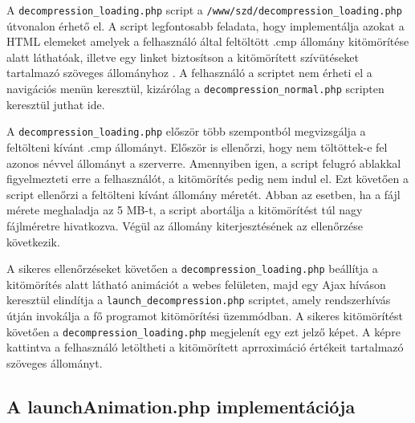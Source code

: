 \documentclass[oneside,titlepage,12pt,a4paper]{report}
\begin{document}
A \texttt{decompression\_loading.php} script a \texttt{/www/szd/decompression\_loading.php} útvonalon érhető el. A script legfontosabb feladata, hogy implementálja azokat a HTML elemeket amelyek a felhasználó által feltöltött .cmp állomány kitömörítése alatt láthatóak, illetve egy linket biztosítson a kitömörített szívütéseket tartalmazó szöveges állományhoz . A felhasználó a scriptet nem érheti el a navigációs menün keresztül, kizárólag a \texttt{decompression\_normal.php} scripten keresztül juthat ide. 
\par A \texttt{decompression\_loading.php} először több szempontból megvizsgálja a feltölteni kívánt .cmp állományt. Először is ellenőrzi, hogy nem töltöttek-e fel azonos névvel állományt a szerverre. Amennyiben igen, a script felugró ablakkal figyelmezteti erre a felhasználót, a kitömörítés pedig nem indul el. Ezt követően a script ellenőrzi a feltölteni kívánt állomány méretét. Abban az esetben, ha a fájl mérete meghaladja az 5 MB-t, a script abortálja a kitömörítést túl nagy fájlméretre hivatkozva. Végül az állomány kiterjesztésének az ellenőrzése következik.
\par A sikeres ellenőrzéseket követően a \texttt{decompression\_loading.php} beállítja a kitömörítés alatt látható animációt a webes felületen, majd egy Ajax híváson keresztül elindítja a \texttt{launch\_decompression.php} scriptet, amely rendszerhívás útján invokálja a fő programot kitömörítési üzemmódban. A sikeres kitömörítést követően a \texttt{decompression\_loading.php} megjelenít egy ezt jelző képet. A képre kattintva a felhasználó letöltheti a kitömörített aprroximáció értékeit tartalmazó szöveges állományt. 

\subsection{A launchAnimation.php implementációja}
\end{document}
